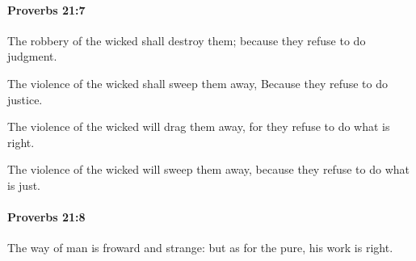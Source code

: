 		\paragraph{Proverbs 21:7} %
			\label{PROVERBS-21-7}

			The robbery of the wicked shall destroy them; because they refuse to do judgment.

			\begin{versebox}
					\item[BHS] 
					\item[ASV] The violence of the wicked shall sweep them away, Because they refuse to do justice.
					\item[NIV] The violence of the wicked will drag them away, for they refuse to do what is right.
					\item[NRSV] The violence of the wicked will sweep them away, because they refuse to do what is just.
			\end{versebox}

		\paragraph{Proverbs 21:8} %
			\label{PROVERBS-21-8}

			The way of man is froward and strange: but as for the pure, his work is right.

